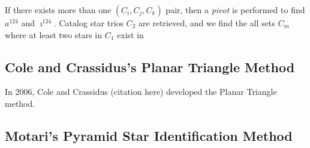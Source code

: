 If there exists more than one $(C_i, C_j, C_k)$ pair, then a \textit{pivot} is performed to find $a^{124}$ and $\imath^{124}$. Catalog star trios $C_2$ are retrieved, and we find the all sets $C_m$ where at least two stars in $C_1$ exist in 

\subsection{Cole and Crassidus's Planar Triangle Method}
In 2006, Cole and Crassidus (citation here) developed the Planar Triangle method. 

\subsection{Motari's Pyramid Star Identification Method}


